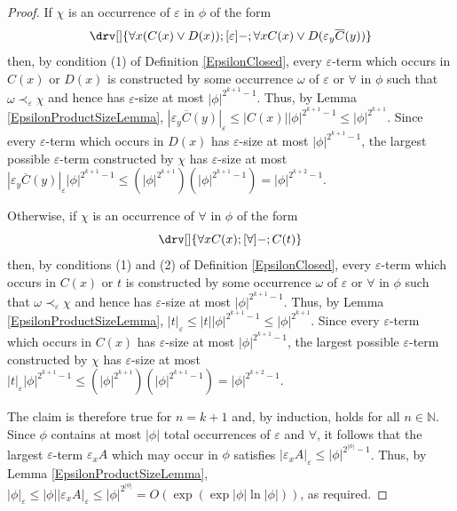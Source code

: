 \documentclass[10pt]{article}
\theoremstyle{definition}\newtheorem{remark}[theorem]{Remark}
\theoremstyle{definition}\newtheorem{example}[theorem]{Example}
\theoremstyle{definition}\newtheorem{definition}[theorem]{Definition}
\newcommand{\falsifierRule}{{\mathsf{\varepsilon}}}
\begin{document}
\begin{proof}
		If $\chi$ is an occurrence of $\falsifierRule$ in $\phi$ of the form
		\[
		\drv[] {
			\forall x (C(x) \lor D(x)) ; [\falsifierRule]- ; \forall x C(x) \lor D(\varepsilon_y \overline{C}(y))
		}
		\]
		then, by condition (1) of Definition \ref{EpsilonClosed}, every $\varepsilon$-term which occurs in $C(x)$ or $D(x)$ is constructed by some occurrence $\omega$ of $\falsifierRule$ or $\forall$ in $\phi$ such that $\omega \prec_\varepsilon \chi$ and hence has $\varepsilon$-size at most $| \phi |^{2^{k + 1} - 1}$. Thus, by Lemma \ref{EpsilonProductSizeLemma}, $| \varepsilon_y \overline{C}(y) |_\varepsilon \leq | C(x) | | \phi |^{2^{k + 1} - 1} \leq | \phi |^{2^{k + 1}}$. Since every $\varepsilon$-term which occurs in $D(x)$ has $\varepsilon$-size at most $| \phi |^{2^{k + 1} - 1}$, the largest possible $\varepsilon$-term constructed by $\chi$ has $\varepsilon$-size at most $| \varepsilon_y \overline{C}(y) |_\varepsilon | \phi |^{2^{k + 1} - 1} \leq (| \phi |^{2^{k + 1}}) (| \phi |^{2^{k + 1} - 1}) = | \phi |^{2^{k + 2} - 1}$.
		
		Otherwise, if $\chi$ is an occurrence of $\forall$ in $\phi$ of the form
		\[
		\drv[] {
			\forall x C(x) ; [\forall]- ; C(t)
		}
		\]
		then, by conditions (1) and (2) of Definition \ref{EpsilonClosed}, every $\varepsilon$-term which occurs in $C(x)$ or $t$ is constructed by some occurrence $\omega$ of $\falsifierRule$ or $\forall$ in $\phi$ such that $\omega \prec_\varepsilon \chi$ and hence has $\varepsilon$-size at most $| \phi |^{2^{k + 1} - 1}$. Thus, by Lemma \ref{EpsilonProductSizeLemma}, $| t |_\varepsilon \leq | t | | \phi |^{2^{k + 1} - 1} \leq | \phi |^{2^{k + 1}}$. Since every $\varepsilon$-term which occurs in $C(x)$ has $\varepsilon$-size at most $| \phi |^{2^{k + 1} - 1}$, the largest possible $\varepsilon$-term constructed by $\chi$ has $\varepsilon$-size at most $| t |_\varepsilon | \phi |^{2^{k + 1} - 1} \leq (| \phi |^{2^{k + 1}}) (| \phi |^{2^{k + 1} - 1}) = | \phi |^{2^{k + 2} - 1}$.
		
		The claim is therefore true for $n = k + 1$ and, by induction, holds for all $n \in \mathbb{N}$. Since $\phi$ contains at most $| \phi |$ total occurrences of $\falsifierRule$ and $\forall$, it follows that the largest $\varepsilon$-term $\varepsilon_x A$ which may occur in $\phi$ satisfies $| \varepsilon_x A |_\varepsilon \leq | \phi |^{2^{| \phi |} - 1}$. Thus, by Lemma \ref{EpsilonProductSizeLemma}, $| \phi |_\varepsilon \leq | \phi | | \varepsilon_x A |_\varepsilon \leq | \phi |^{2^{| \phi |}} = O(\exp (\exp | \phi | \ln | \phi |))$, as required.
	\end{proof}
	
\end{document}
